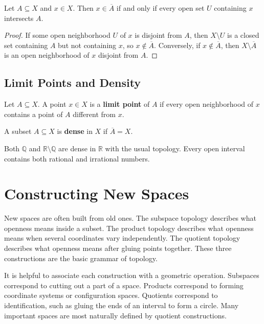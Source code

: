 \begin{proposition}
Let $A\subseteq X$ and $x\in X$. Then $x\in\overline{A}$ if and only if every open set $U$ containing $x$ intersects $A$.
\end{proposition}

\begin{proof}
If some open neighborhood $U$ of $x$ is disjoint from $A$, then $X\setminus U$ is a closed set containing $A$ but not containing $x$, so $x\notin\overline{A}$. Conversely, if $x\notin\overline{A}$, then $X\setminus\overline{A}$ is an open neighborhood of $x$ disjoint from $A$.
\end{proof}

\subsection{Limit Points and Density}

\begin{definition}
Let $A\subseteq X$. A point $x\in X$ is a \textbf{limit point} of $A$ if every open neighborhood of $x$ contains a point of $A$ different from $x$.
\end{definition}

\begin{definition}
A subset $A\subseteq X$ is \textbf{dense} in $X$ if $\overline{A}=X$.
\end{definition}

\begin{example}
Both $\mathbb{Q}$ and $\mathbb{R}\setminus\mathbb{Q}$ are dense in $\mathbb{R}$ with the usual topology. Every open interval contains both rational and irrational numbers.
\end{example}

\section{Constructing New Spaces}


New spaces are often built from old ones. The subspace topology describes what openness means inside a subset. The product topology describes what openness means when several coordinates vary independently. The quotient topology describes what openness means after gluing points together. These three constructions are the basic grammar of topology.

It is helpful to associate each construction with a geometric operation. Subspaces correspond to cutting out a part of a space. Products correspond to forming coordinate systems or configuration spaces. Quotients correspond to identification, such as gluing the ends of an interval to form a circle. Many important spaces are most naturally defined by quotient constructions.

